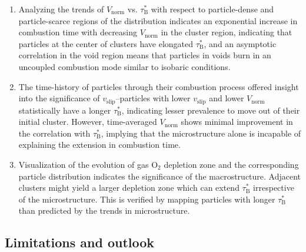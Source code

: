 \documentclass[times,twocolumn,final]{elsarticle}
\newcommand{\mrm}[1]{\mathrm{#1}}
\newcommand{\taub}{\tau_\mathrm{B}}
\begin{document}
\begin{enumerate}[label=RQ:\Roman*,leftmargin=1.1cm, wide]
    
    
    \item Analyzing the trends of $V_\mrm{norm}$ vs. $\taub^*$ with respect to particle-dense and particle-scarce regions of the distribution indicates an exponential increase in combustion time with decreasing $V_\mrm{norm}$ in the cluster region, indicating that particles at the center of clusters have elongated $\taub^*$, and an asymptotic correlation in the void region means that particles in voids burn in an uncoupled combustion mode similar to isobaric conditions.
    
    \item The time-history of particles through their combustion process offered insight into the significance of $v_\mrm{slip}$--particles with lower $v_\mrm{slip}$ and lower $V_\mrm{norm}$ statistically have a longer $\taub^*$, indicating lesser prevalence to move out of their initial cluster. However, time-averaged $V_\mrm{norm}$ shows minimal improvement in the correlation with $\taub^*$, implying that the microstructure alone is incapable of explaining the extension in combustion time.
    
    \item Visualization of the evolution of gas $\mrm{O_2}$ depletion zone and the corresponding particle distribution indicates the significance of the macrostructure. Adjacent clusters might yield a larger depletion zone which can extend $\taub^*$ irrespective of the microstructure. This is verified by mapping particles with longer $\taub^*$ than predicted by the trends in microstructure. 
    
\end{enumerate}

\subsection{Limitations and outlook}
\end{document}
